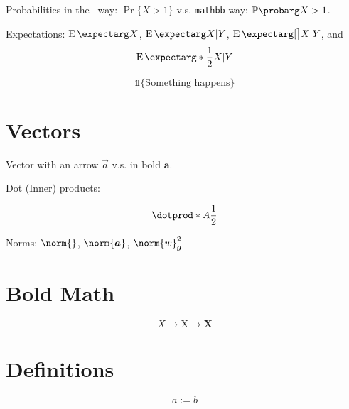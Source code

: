 \documentclass{article}
\begin{document}
Probabilities in the \LaTeXe\ way: $\Pr\{X > 1\}$ v.s.
\verb|mathbb| way: $\P{X>1}$.

Expectations: $\E{X}$, $\E{X|Y}$, $\E[\big]{X|Y}$, and
\[
\E*{\frac{1}{2} X | Y}
\]

\newcommand*{\Ind}[1]{\mathds{1}\{#1\}}

\[
\Ind{\text{Something happens}}
\]

\section{Vectors}

\let\arrvec\vec
\renewcommand*{\vec}{\bm}

Vector with an arrow $\arrvec{a}$ v.s. in bold $\vec{a}$.

Dot (Inner) products:

\DeclarePairedDelimiterX{}

\[
\dotprod*{A}{\frac{1}{2}}
\]

\DeclarePairedDelimiterX\norm[1]\lVert{}

Norms: $\norm{}$, $\norm{\vec{a}}$, $\norm{w}_{\vec{g}}^2$

\section{Bold Math}

{\boldmath
$$ X \rightarrow \mathrm{X} \rightarrow \mathbf{X} $$
}

\section{Definitions}
\[
a := b
\]

\appendix


%
%
\end{document}
